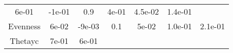 \documentclass[12pt,]{article}
\begin{document}
\begin{longtable}[]{@{}ccccccc@{}}
\begin{minipage}[t]{0.10\columnwidth}
6e-01\strut
\end{minipage} & \begin{minipage}[t]{0.12\columnwidth}\centering\strut
-1e-01\strut
\end{minipage} & \begin{minipage}[t]{0.09\columnwidth}\centering\strut
0.9\strut
\end{minipage} & \begin{minipage}[t]{0.11\columnwidth}\centering\strut
4e-01\strut
\end{minipage} & \begin{minipage}[t]{0.07\columnwidth}\centering\strut
4.5e-02\strut
\end{minipage} & \begin{minipage}[t]{0.10\columnwidth}\centering\strut
1.4e-01\strut
\end{minipage}\tabularnewline
\begin{minipage}[t]{0.22\columnwidth}\centering\strut
Evenness\strut
\end{minipage} & \begin{minipage}[t]{0.10\columnwidth}\centering\strut
6e-02\strut
\end{minipage} & \begin{minipage}[t]{0.12\columnwidth}\centering\strut
-9e-03\strut
\end{minipage} & \begin{minipage}[t]{0.09\columnwidth}\centering\strut
0.1\strut
\end{minipage} & \begin{minipage}[t]{0.11\columnwidth}\centering\strut
5e-02\strut
\end{minipage} & \begin{minipage}[t]{0.07\columnwidth}\centering\strut
1.0e-01\strut
\end{minipage} & \begin{minipage}[t]{0.10\columnwidth}\centering\strut
2.1e-01\strut
\end{minipage}\tabularnewline
\begin{minipage}[t]{0.22\columnwidth}\centering\strut
Thetayc\strut
\end{minipage} & \begin{minipage}[t]{0.10\columnwidth}\centering\strut
7e-01\strut
\end{minipage} & \begin{minipage}[t]{0.12\columnwidth}\centering\strut
6e-01\strut
\end{minipage} & \begin{minipage}[t]{0.09\columnwidth}\centering\strut

\end{minipage}
\end{longtable}
\end{document}
